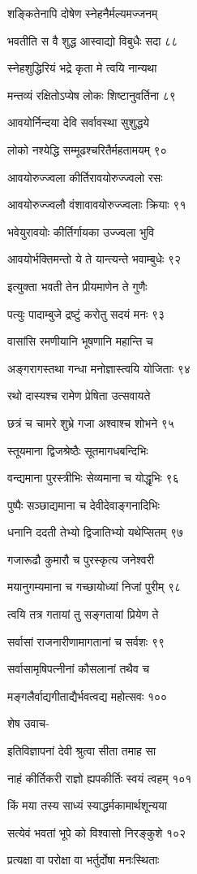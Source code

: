 शङ्कितेनापि दोषेण स्नेहनैर्मल्यमज्जनम्

भवतीति स वै शुद्ध आस्वाद्यो विबुधैः सदा ८८

स्नेहशुद्धिरियं भद्रे कृता मे त्वयि नान्यथा

मन्तव्यं रक्षितोऽप्येष लोकः शिष्टानुवर्तिना ८९

आवयोर्निन्दया देवि सर्वावस्था सुशुद्धये

लोको नश्येद्धि सम्मूढश्चरितैर्महतामयम् ९०

आवयोरुज्ज्वला कीर्तिरावयोरुज्ज्वलो रसः

आवयोरुज्ज्वलौ वंशावावयोरुज्ज्वलाः क्रियाः ९१

भवेयुरावयोः कीर्तिर्गायका उज्ज्वला भुवि

आवयोर्भक्तिमन्तो ये ते यान्त्यन्ते भवाम्बुधेः ९२

इत्युक्ता भवती तेन प्रीयमाणेन ते गुणैः

पत्युः पादाम्बुजे द्रष्टुं करोतु सदयं मनः ९३

वासांसि रमणीयानि भूषणानि महान्ति च

अङ्गरागस्तथा गन्धा मनोज्ञास्त्वयि योजिताः ९४

रथो दास्यश्च रामेण प्रेषिता उत्सवायते

छत्रं च चामरे शुभ्रे गजा अश्वाश्च शोभने ९५

स्तूयमाना द्विजश्रेष्ठैः सूतमागधबन्दिभिः

वन्द्यमाना पुरस्त्रीभिः सेव्यमाना च योद्धृभिः ९६

पुष्पैः सञ्छाद्यमाना च देवीदेवाङ्गनादिभिः

धनानि ददती तेभ्यो द्विजातिभ्यो यथेप्सितम् ९७

गजारूढौ कुमारौ च पुरस्कृत्य जनेश्वरी

मयानुगम्यमाना च गच्छायोध्यां निजां पुरीम् ९८

त्वयि तत्र गतायां तु सङ्गतायां प्रियेण ते

सर्वासां राजनारीणामागतानां च सर्वशः ९९

सर्वासामृषिपत्नीनां कौसलानां तथैव च

मङ्गलैर्वाद्यगीताद्यैर्भवत्वद्य महोत्सवः १००

शेष उवाच-

इतिविज्ञापनां देवी श्रुत्वा सीता तमाह सा

नाहं कीर्तिकरी राज्ञो ह्यपकीर्तिः स्वयं त्वहम् १०१

किं मया तस्य साध्यं स्याद्धर्मकामार्थशून्यया

सत्येवं भवतां भूपे को विश्वासो निरङ्कुशे १०२

प्रत्यक्षा वा परोक्षा वा भर्तुर्दोषा मनःस्थिताः


